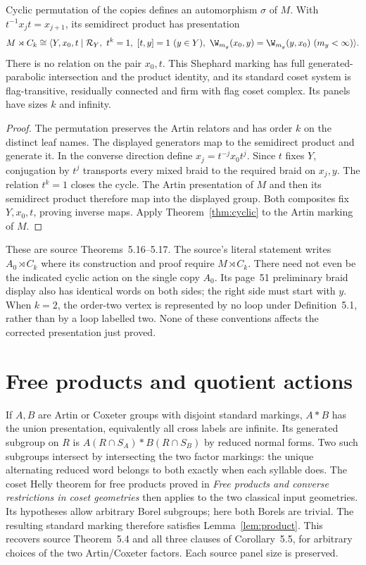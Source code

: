 \begin{theorem}\label{thm:amalgam}
Cyclic permutation of the copies defines an automorphism $\sigma$ of
$M$. With $t^{-1}x_jt=x_{j+1}$, its semidirect product has presentation
\[
 M\rtimes C_k\cong
 \langle Y,x_0,t\mid\mathcal R_Y,\ t^k=1,\ [t,y]=1\ (y\in Y),\
 \W_{m_y}(x_0,y)=\W_{m_y}(y,x_0)\ (m_y<\infty)\rangle.
\]
There is no relation on the pair $x_0,t$. This Shephard marking has
full generated-parabolic intersection and the product identity,
and its standard coset system is flag-transitive, residually connected
and firm with flag coset complex. Its panels have sizes $k$ and
infinity.
\end{theorem}
\begin{proof}
The permutation preserves the Artin relators and has order $k$ on
the distinct leaf names. The displayed generators map to the
semidirect product and generate it. In the converse direction define
$x_j=t^{-j}x_0t^j$. Since $t$ fixes $Y$, conjugation by $t^j$
transports every mixed braid to the required braid on $x_j,y$.
The relation $t^k=1$ closes the cycle. The Artin presentation of
$M$ and then its semidirect product therefore map into the displayed
group. Both composites fix $Y,x_0,t$, proving inverse maps. Apply
Theorem~\ref{thm:cyclic} to the Artin marking of $M$.
\end{proof}
These are source Theorems~5.16--5.17. The source's literal statement
writes $A_0\rtimes C_k$ where its construction and proof require
$M\rtimes C_k$. There need not even be the indicated cyclic action
on the single copy $A_0$. Its page~51 preliminary braid display also
has identical words on both sides; the right side must start with
$y$. When $k=2$, the order-two vertex is represented by no loop under
Definition~5.1, rather than by a loop labelled two. None of these
conventions affects the corrected presentation just proved.

\section{Free products and quotient actions}
If $A,B$ are Artin or Coxeter groups with disjoint standard markings,
$A*B$ has the union presentation, equivalently all cross labels are
infinite. Its generated subgroup on $R$ is
$A(R\cap S_A)*B(R\cap S_B)$ by reduced normal forms. Two such
subgroups intersect by intersecting the two factor markings: the
unique alternating reduced word belongs to both exactly when each
syllable does. The coset Helly theorem for free products proved in
\emph{Free products and converse restrictions in coset geometries}
then applies to the two classical input geometries. Its hypotheses
allow arbitrary Borel subgroups; here both Borels are trivial.
The resulting standard marking therefore satisfies
Lemma~\ref{lem:product}. This recovers source Theorem~5.4 and all
three clauses of Corollary~5.5, for arbitrary choices of the two
Artin/Coxeter factors. Each source panel size is preserved.

